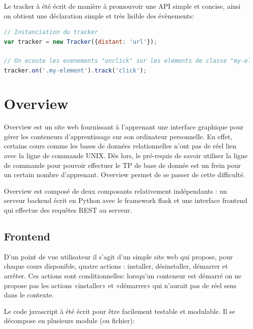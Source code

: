 \documentclass[a4paper,11pt]{report}
\begin{document}
Le tracker à été écrit de manière à promouvoir une API simple et concise, ainsi on obtient une déclaration simple et très lisible des évènements:

\begin{lstlisting}[language=javascript, caption={Exemple d'utilisation de tracker.js}]
// Instanciation du tracker
var tracker = new Tracker({distant: 'url'});

// On ecoute les evenements "onclick" sur les elements de classe "my-element"
tracker.on('.my-element').track('click');
\end{lstlisting}

\section{Overview}

Overview est un site web fournissant à l'apprenant une interface graphique pour gérer les conteneurs d'apprentissage sur son ordinateur personnelle.
En effet, certains cours comme les bases de données relationnelles n'ont pas de réel lien avec la ligne de commande UNIX. Dès lors, le pré-requis de savoir utiliser la ligne de commande pour pouvoir effectuer le TP de base de donnée est un frein pour un certain nombre d'apprenant. Overview permet de se passer de cette difficulté.

Overview est composé de deux composants relativement indépendants : un serveur backend écrit en Python avec le framework flask et une interface frontend qui effectue des requêtes REST au serveur.

\subsection{Frontend}

D'un point de vue utilisateur il s'agit d'un simple site web qui propose, pour chaque cours disponible, quatre actions : installer, désinstaller, démarrer et arrêter. Ces actions sont conditionnelles: lorsqu'un conteneur est démarré on ne propose pas les actions «installer» et «démarrer» qui n'aurait pas de réel sens dans le contexte.

Le code javascript à été écrit pour être facilement testable et modulable. Il se décompose en plusieurs module (ou fichier):
\end{document}

